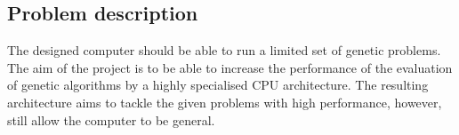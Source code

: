 \subsection{Problem description}
The designed computer should be able to run a limited set of genetic problems. The aim of the project is to be able to increase the performance of the evaluation of genetic algorithms by a highly specialised CPU architecture. The resulting architecture aims to tackle the given problems with high performance, however, still allow the computer to be general.
